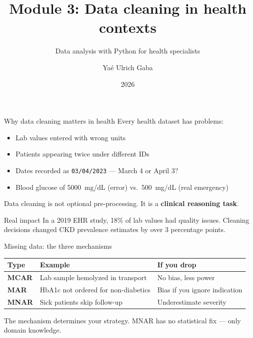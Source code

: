 \documentclass[aspectratio=169,11pt]{beamer}
\title{Module 3: Data cleaning in health contexts}
\subtitle{Data analysis with Python for health specialists}
\author{Yaé Ulrich Gaba}
\institute{AIRINA Labs}
\date{2026}
\begin{document}
\maketitle

\begin{frame}{Why data cleaning matters in health}
Every health dataset has problems:
\begin{itemize}
  \item Lab values entered with wrong units
  \item Patients appearing twice under different IDs
  \item Dates recorded as \texttt{03/04/2023} --- March 4 or April 3?
  \item Blood glucose of 5000~mg/dL (error) vs.\ 500~mg/dL (real emergency)
\end{itemize}

\vspace{6pt}
Data cleaning is \alert{not optional pre-processing}. It is a \textbf{clinical reasoning task}.

\vspace{6pt}
\begin{alertblock}{Real impact}
In a 2019 EHR study, 18\% of lab values had quality issues. Cleaning decisions changed CKD prevalence estimates by over 3 percentage points.
\end{alertblock}
\end{frame}

\begin{frame}{Missing data: the three mechanisms}
\begin{table}
\begin{tabular}{lp{4.5cm}p{4.5cm}}
\toprule
\textbf{Type} & \textbf{Example} & \textbf{If you drop} \\
\midrule
\textbf{MCAR} & Lab sample hemolyzed in transport & No bias, less power \\
\textbf{MAR} & HbA1c not ordered for non-diabetics & Bias if you ignore indication \\
\textbf{MNAR} & Sick patients skip follow-up & \alert{Underestimate severity} \\
\bottomrule
\end{tabular}
\end{table}

\vspace{6pt}
The mechanism determines your strategy. \alert{MNAR has no statistical fix} --- only domain knowledge.
\end{frame}
\end{document}
